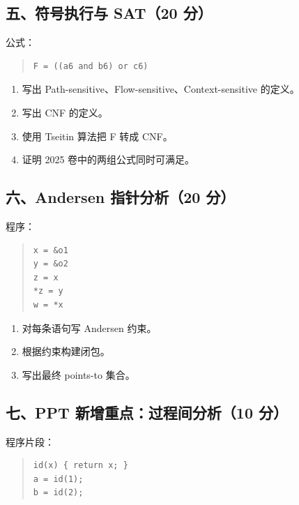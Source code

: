 \documentclass[UTF8,zihao=-4]{ctexart}
\begin{document}
\subsection{五、符号执行与 SAT（20 分）}


公式：


\begin{quote}
\footnotesize
\begin{verbatim}
F = ((a6 and b6) or c6)
\end{verbatim}
\end{quote}


\begin{enumerate}
\item 写出 Path-sensitive、Flow-sensitive、Context-sensitive 的定义。
\item 写出 CNF 的定义。
\item 使用 Tseitin 算法把 F 转成 CNF。
\item 证明 2025 卷中的两组公式同时可满足。
\end{enumerate}


\subsection{六、Andersen 指针分析（20 分）}


程序：


\begin{quote}
\footnotesize
\begin{verbatim}
x = &o1
y = &o2
z = x
*z = y
w = *x
\end{verbatim}
\end{quote}


\begin{enumerate}
\item 对每条语句写 Andersen 约束。
\item 根据约束构建闭包。
\item 写出最终 points-to 集合。
\end{enumerate}


\subsection{七、PPT 新增重点：过程间分析（10 分）}


程序片段：

\begin{quote}
\footnotesize
\begin{verbatim}
id(x) { return x; }
a = id(1);
b = id(2);
\end{verbatim}
\end{quote}
\end{document}
